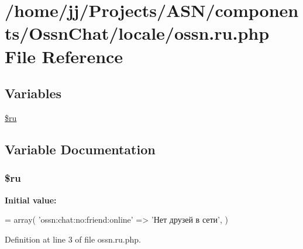 \hypertarget{components_2_ossn_chat_2locale_2ossn_8ru_8php}{}\section{/home/jj/\+Projects/\+A\+S\+N/components/\+Ossn\+Chat/locale/ossn.ru.\+php File Reference}
\label{components_2_ossn_chat_2locale_2ossn_8ru_8php}
\subsection*{Variables}
\begin{DoxyCompactItemize}
\item 
\hyperlink{components_2_ossn_chat_2locale_2ossn_8ru_8php_aab84a3feda2b0e489cac7cd194e8d726}{\$ru}
\end{DoxyCompactItemize}


\subsection{Variable Documentation}
\subsubsection[{\texorpdfstring{\$ru}{$ru}}]{\setlength{\rightskip}{0pt plus 5cm}\$ru}\hypertarget{components_2_ossn_chat_2locale_2ossn_8ru_8php_aab84a3feda2b0e489cac7cd194e8d726}{}\label{components_2_ossn_chat_2locale_2ossn_8ru_8php_aab84a3feda2b0e489cac7cd194e8d726}
{\bfseries Initial value\+:}
\begin{DoxyCode}
= array(
    \textcolor{stringliteral}{'ossn:chat:no:friend:online'} => \textcolor{stringliteral}{'Нет друзей в сети'},
)
\end{DoxyCode}


Definition at line 3 of file ossn.\+ru.\+php.

